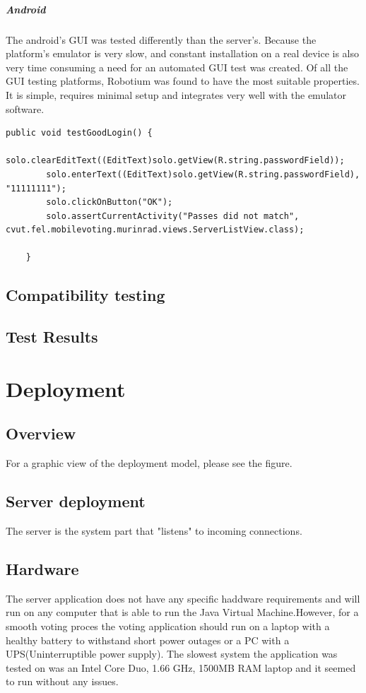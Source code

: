 \documentclass[11pt,twoside,a4paper]{book}
\begin{document}
\paragraph{Android}
The android's GUI was tested differently than the server's. Because the platform's emulator is very slow, and constant installation on a real device is also very time consuming a need for an automated GUI test was created. Of all the GUI testing platforms, Robotium was found to have the most suitable properties. It is simple, requires minimal setup and integrates very well with the emulator software. \\
\begin{lstlisting}
public void testGoodLogin() {
		solo.clearEditText((EditText)solo.getView(R.string.passwordField));
		solo.enterText((EditText)solo.getView(R.string.passwordField), "11111111");
		solo.clickOnButton("OK");
		solo.assertCurrentActivity("Passes did not match", cvut.fel.mobilevoting.murinrad.views.ServerListView.class);
		
	}
\end{lstlisting}
\section{Compatibility testing}
\section{Test Results}

 \chapter{Deployment}
\section{Overview}
For a graphic view of the deployment model, please see the figure. 
\section{Server deployment}
The server is the system part that "listens" to incoming connections.
\section{Hardware}
The server application does not have any specific haddware requirements and will run on any computer that is able to run the Java Virtual Machine.However, for a smooth voting proces the voting application should run on a laptop with a healthy battery to withstand short power outages or a PC with a UPS(Uninterruptible power supply). The slowest system the application was tested on was an Intel Core Duo, 1.66 GHz, 1500MB RAM laptop and it seemed to run without any issues. 
\end{document}
